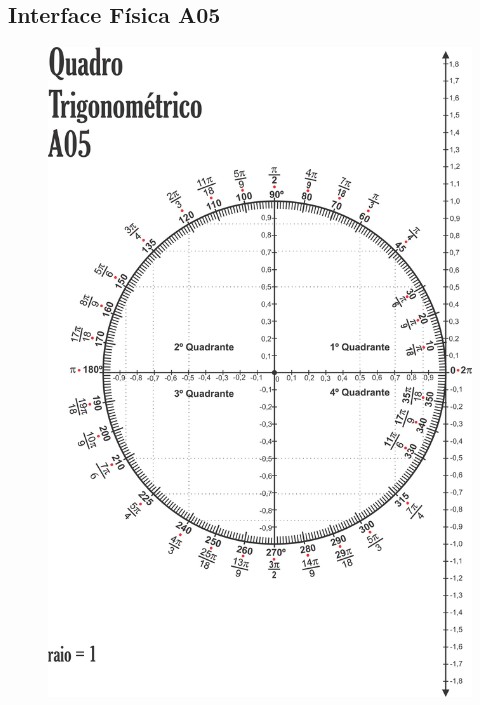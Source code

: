 \subsection{Interface Física A05}\label{subsection:atividade3_A05}
\begin{figure}[htb]
	\centering
	\includegraphics[width=0.9\linewidth]{chapters/appendixLesson/Interface_A05.png}
\end{figure}
\clearpage

